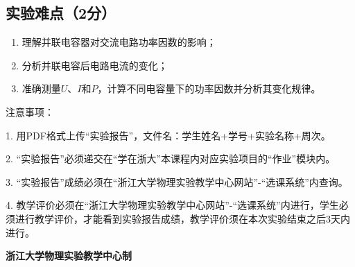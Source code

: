 \documentclass[10pt,a4paper]{ctexart} %
\begin{document}
  \subsection{实验难点（2分）}
  \begin{enumerate}
    \item 理解并联电容器对交流电路功率因数的影响；
    \item 分析并联电容后电路电流的变化；
    \item 准确测量$U$、$I$和$P$，计算不同电容量下的功率因数并分析其变化规律。
  \end{enumerate}

\vspace*{\fill} %
\noindent
\begin{minipage}{\textwidth}
  注意事项：

  \begingroup
    \setlength{\leftskip}{2em} %
    1. 用PDF格式上传“实验报告”，文件名：学生姓名+学号+实验名称+周次。

    2. “实验报告”必须递交在“学在浙大”本课程内对应实验项目的“作业”模块内。

    3. “实验报告”成绩必须在“浙江大学物理实验教学中心网站”-“选课系统”内查询。

    4. 教学评价必须在“浙江大学物理实验教学中心网站”-“选课系统”内进行，学生必须进行教学评价，才能看到实验报告成绩，教学评价须在本次实验结束之后3天内进行。\par
  \endgroup

  \begin{center}
    {\bfseries 浙江大学物理实验教学中心制}
  \end{center}
\end{minipage}
\end{document}

